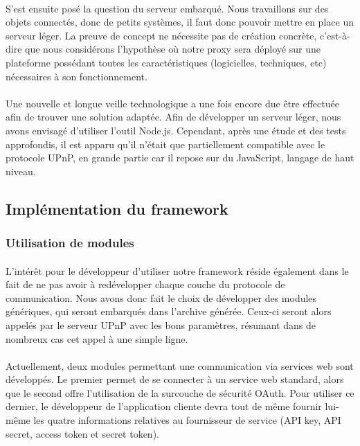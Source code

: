 \documentclass[nocopyrightspace]{sigplanconf}
\begin{document}
			\paragraph{}
			S’est ensuite posé la question du serveur embarqué. Nous travaillons sur des objets connectés, donc de petits systèmes, il faut donc pouvoir mettre en place un serveur léger. La preuve de concept ne nécessite pas de création concrète, c’est-à-dire que nous considérons l’hypothèse où notre proxy sera déployé sur une plateforme possédant toutes les caractéristiques (logicielles, techniques, etc) nécessaires à son fonctionnement.

			\paragraph{}
			Une nouvelle et longue veille technologique a une fois encore due être effectuée afin de trouver une solution adaptée. Afin de développer un serveur léger, nous avons envisagé d’utiliser l’outil Node.js\cite{nodejs}. Cependant, après une étude et des tests approfondis, il est apparu qu’il n’était que partiellement compatible avec le protocole UPnP, en grande partie car il repose sur du JavaScript, langage de haut niveau.

	\subsection{Implémentation du framework}

		\subsubsection{Utilisation de modules}

			\paragraph{}
			L'intérêt pour le développeur d'utiliser notre framework réside également dans le fait de ne pas avoir à redévelopper chaque couche du protocole de communication. Nous avons donc fait le choix de développer des modules génériques, qui seront embarqués dans l'archive générée. Ceux-ci seront alors appelés par le serveur UPnP avec les bons paramètres, résumant dans de nombreux cas cet appel à une simple ligne.

			\paragraph{}
			Actuellement, deux modules permettant une communication via services web sont développés. Le premier permet de se connecter à un service web standard, alors que le second offre l'utilisation de la surcouche de sécurité OAuth. Pour utiliser ce dernier, le développeur de l'application cliente devra tout de même fournir lui-même les quatre informations relatives au fournisseur de service (API key, API secret, access token et secret token). 
		
\end{document}
